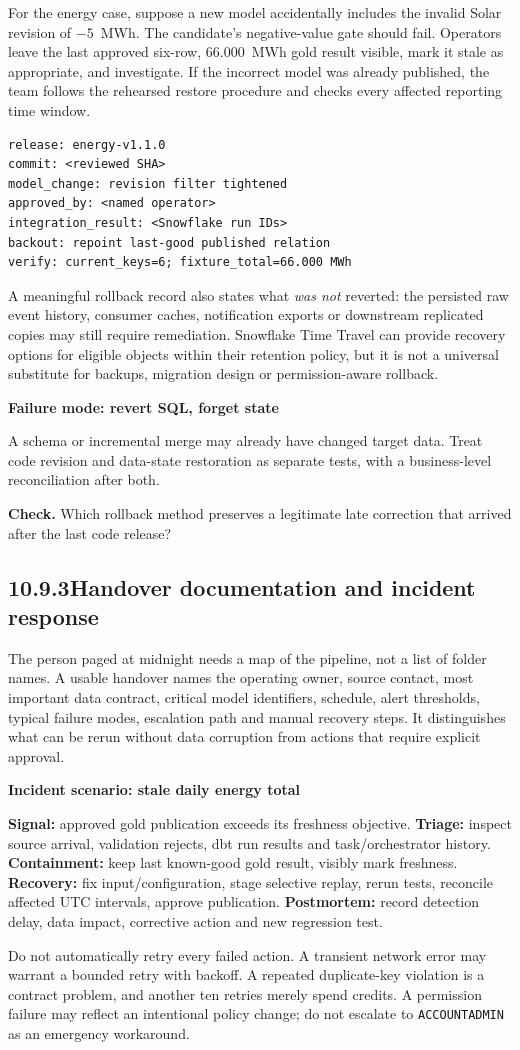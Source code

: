 \documentclass[11pt,twoside]{article}
\newcommand{\topic}[2]{\subsection*{#1\quad #2}}
\begin{document}
For the energy case, suppose a new model accidentally includes the invalid Solar revision of $-5$~MWh. The candidate's negative-value gate should fail. Operators leave the last approved six-row, 66.000~MWh gold result visible, mark it stale as appropriate, and investigate. If the incorrect model was already published, the team follows the rehearsed restore procedure and checks every affected reporting time window.
\begin{lstlisting}[caption={Minimum change-log entry.}]
release: energy-v1.1.0
commit: <reviewed SHA>
model_change: revision filter tightened
approved_by: <named operator>
integration_result: <Snowflake run IDs>
backout: repoint last-good published relation
verify: current_keys=6; fixture_total=66.000 MWh
\end{lstlisting}
A meaningful rollback record also states what \emph{was not} reverted: the persisted raw event history, consumer caches, notification exports or downstream replicated copies may still require remediation. Snowflake Time Travel can provide recovery options for eligible objects within their retention policy, but it is not a universal substitute for backups, migration design or permission-aware rollback.
\begin{insight}\textbf{Failure mode: revert SQL, forget state}\par
A schema or incremental merge may already have changed target data. Treat code revision and data-state restoration as separate tests, with a business-level reconciliation after both.\end{insight}
\textbf{Check.} Which rollback method preserves a legitimate late correction that arrived after the last code release?
\newpage
\topic{10.9.3}{Handover documentation and incident response}
The person paged at midnight needs a map of the pipeline, not a list of folder names. A usable handover names the operating owner, source contact, most important data contract, critical model identifiers, schedule, alert thresholds, typical failure modes, escalation path and manual recovery steps. It distinguishes what can be rerun without data corruption from actions that require explicit approval.
\begin{whitebox}\textbf{Incident scenario: stale daily energy total}\par
\textbf{Signal:} approved gold publication exceeds its freshness objective. \textbf{Triage:} inspect source arrival, validation rejects, dbt run results and task/orchestrator history. \textbf{Containment:} keep last known-good gold result, visibly mark freshness. \textbf{Recovery:} fix input/configuration, stage selective replay, rerun tests, reconcile affected UTC intervals, approve publication. \textbf{Postmortem:} record detection delay, data impact, corrective action and new regression test.\end{whitebox}
Do not automatically retry every failed action. A transient network error may warrant a bounded retry with backoff. A repeated duplicate-key violation is a contract problem, and another ten retries merely spend credits. A permission failure may reflect an intentional policy change; do not escalate to \texttt{ACCOUNTADMIN} as an emergency workaround.
\end{document}
